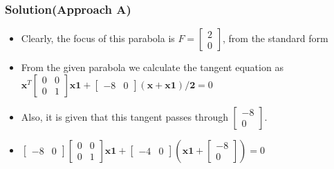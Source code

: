 \documentclass{beamer}
\begin{document}
\begin{frame}
\frametitle{Solution(Approach A)}
\begin{itemize}
	\item<1-> Clearly, the focus of this parabola is $F = \begin{bmatrix} 2 \\ 0
	\end{bmatrix}$, from the standard form
	\item<2-> From the given parabola we calculate the tangent equation as $\mathbf{x}^T \begin{bmatrix} 0 & 0 \\0 & 1
	\end{bmatrix} \mathbf{x1} + \begin{bmatrix} -8 & 0
	\end{bmatrix} \mathbf{(x + x1)/2} = 0$ \newline
	\newline

	\item<3-> Also, it is given that this tangent passes through $\begin{bmatrix} -8 \\ 0
	\end{bmatrix}$.
	\newline
	\newline
	
	\item<4->$ \begin{bmatrix} -8 & 0
	\end{bmatrix}\begin{bmatrix} 0 & 0 \\0 & 1
	\end{bmatrix} \mathbf{x1} + \begin{bmatrix} -4 & 0
	\end{bmatrix} (\mathbf{x1} +\begin{bmatrix} -8 \\ 0
	\end{bmatrix} ) = 0$ \newline
	\newline
\end{itemize}
\end{frame}
\end{document}
